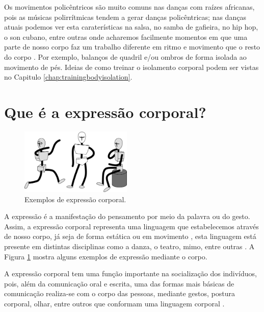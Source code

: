 Os movimentos policêntricos são muito comuns nas danças com raízes africanas,
pois as músicas polirrítmicas tendem a gerar danças policêntricas;
nas danças atuais podemos ver esta caraterísticas na salsa, no samba de gafieira, no hip hop, o son cubano, entre outras
onde acharemos facilmente momentos em que uma parte de nosso corpo faz um trabalho
diferente em ritmo e movimento que o resto do corpo 
\cite[pp. 25]{grob2020dance} \cite[pp. 202-203]{madrid2013danzon} 
\cite[pp. 146]{dils2001moving} \cite[pp. 220]{antonacci2013memorias}.
Por exemplo, balanços de quadril e/ou ombros de forma isolada ao movimento de pés.
Ideias de como treinar o isolamento corporal podem ser vistas no Capitulo \ref{chap:trainingbodyisolation}.

\section{Que é a expressão corporal?}
\label{sec:BodyExpression}


\begin{figure}
\vspace{-10pt}
  \centering
    \includegraphics[width=0.475\textwidth]{chapters/cap-body/bodyexpresion-medo.eps}
\caption{Exemplos de expressão corporal.}
\vspace{-10pt}
\label{fig:bodyexpression1}
\end{figure}
A expressão é a manifestação do pensamento por meio da palavra ou do gesto.
Assim, a expressão corporal representa uma linguagem que estabelecemos através de nosso corpo,
já seja de forma estática ou em movimento  
\cite{bueno2016psicomotricidade} \cite[pp. 5]{balcells2002expresion},
esta linguagem está presente em distintas disciplinas como a danza, o teatro, mimo, entre outras 
\cite[pp. 5]{balcells2002expresion}.
A Figura \ref{fig:bodyexpression1} mostra alguns exemplos de expressão mediante o corpo.

A expressão corporal tem uma função importante na socialização dos indivíduos,
pois, além da comunicação oral e escrita, 
uma das formas mais básicas de comunicação realiza-se com o corpo das 
pessoas, mediante gestos, postura corporal, olhar, entre outros que conformam 
uma linguagem corporal 
\cite{bueno2016psicomotricidade} \cite[pp. 6]{balcells2002expresion}.








